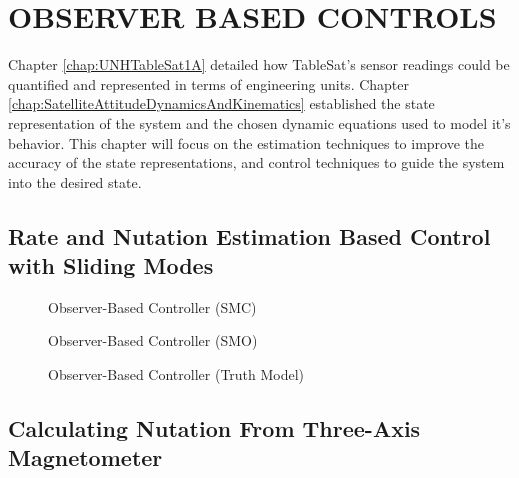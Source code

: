 
\chapter{OBSERVER BASED CONTROLS}
\label{chap:ObserverBasedControls}

Chapter \ref{chap:UNHTableSat1A} detailed how TableSat's sensor readings could be quantified and represented in terms of engineering units.  Chapter \ref{chap:SatelliteAttitudeDynamicsAndKinematics} established the state representation of the system and the chosen dynamic equations used to model it's behavior.  This chapter will focus on the estimation techniques to improve the accuracy of the state representations, and control techniques to guide the system into the desired state.

\section{Rate and Nutation Estimation Based Control with Sliding Modes}
\label{sec:RateandNutationEstimationBasedControllers}

\begin{figure}[H]
  \centerline{}
  \caption{Observer-Based Controller (SMC)}
  \label{fig:ObserverBasedControllerSMC}
\end{figure}

\begin{figure}[H]
  \centerline{}
  \caption{Observer-Based Controller (SMO)}
  \label{fig:ObserverBasedControllerSMO}
\end{figure}

\begin{figure}[H]
  \centerline{}
  \caption{Observer-Based Controller (Truth Model)}
  \label{fig:ObserverBasedControllerTruth}
\end{figure}



\section{Calculating Nutation From Three-Axis Magnetometer}

